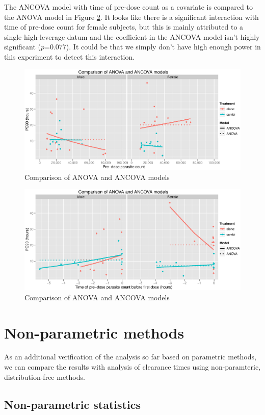 The ANCOVA model with time of pre-dose count as a covariate is compared to the ANOVA model in Figure \ref{compancova2}.
It looks like there is a significant interaction with time of pre-dose count for female subjects, but this is mainly attributed to a single high-leverage datum and the coefficient in the ANCOVA model isn't highly significant ($p$=0.077). It could be that we simply don't have high enough power in this experiment to detect this interaction.

\begin{figure}[p]
\includegraphics[width=150mm]{compancova.eps} 
\caption{Comparison of ANOVA and ANCOVA models}
\label{compancova}
\end{figure}
\begin{figure}[p]
\includegraphics[width=150mm]{compancova2.eps} 
\caption{Comparison of ANOVA and ANCOVA models}
\label{compancova2}
\end{figure}
\clearpage
\section{Non-parametric methods}
As an additional verification of the analysis so far based on parametric methods, we can compare the results with analysis of clearance times using non-paramteric, distribution-free methods.
\subsection{Non-parametric statistics}
